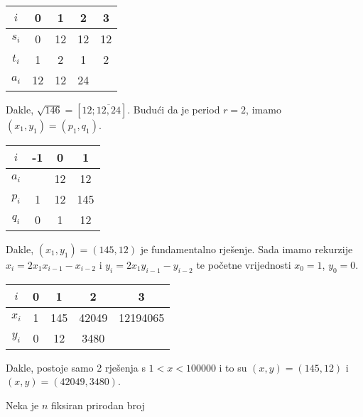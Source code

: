 \documentclass{exam}
\begin{document}
\begin{questions}
\begin{solution}
  \begin{tabular}{|c|cccc|}
    \hline
    $i$ & 0 & 1 & 2 & 3 \\
    \hline
    $s_{i}$ & 0 & 12 & 12 & 12 \\
    \hline
    $t_{i}$ & 1 & 2 & 1 & 2 \\
    \hline
    $a_{i}$ & 12 & 12 & 24 & \\
    \hline
  \end{tabular}

  Dakle, $\sqrt{146} = [12; \overline{12, 24}]$. Budući da je period $r = 2$, imamo $(x_1, y_1) = (p_1, q_1)$.

  \begin{tabular}{|c|ccc|}
    \hline
    $i$ & -1 & 0 & 1\\
    \hline
    $a_i$ & & 12 & 12\\
    \hline
    $p_i$ & 1 & 12 & 145\\
    \hline
    $q_i$ & 0 & 1 & 12\\
    \hline
  \end{tabular}

  Dakle, $(x_1, y_1) = (145, 12)$ je fundamentalno rješenje. Sada imamo rekurzije $x_i = 2x_1x_{i-1} - x_{i-2}$ i $y_i = 2x_1y_{i-1} - y_{i-2}$ te početne vrijednosti $x_0 = 1$, $y_0 = 0$.

  \begin{tabular}{|c|cccc|}
    \hline
    $i$ & 0 & 1 & 2 & 3\\
    \hline
    $x_i$ & 1 & 145 & 42049 & 12194065\\
    \hline
    $y_i$ & 0 & 12 & 3480 &\\
    \hline
  \end{tabular}

  Dakle, postoje samo 2 rješenja s $1 < x < 100000$ i to su $(x, y) = (145, 12)$ i $(x, y) = (42049, 3480)$.
\end{solution}

\pagebreak

\question Neka je $n$ fiksiran prirodan broj
\end{questions}
\end{document}
